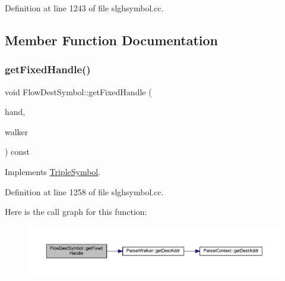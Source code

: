Definition at line 1243 of file slghsymbol.\+cc.



\subsection{Member Function Documentation}
\mbox{\label{class_flow_dest_symbol_aac3ddb7a9bff23acbd59f3b44f477d10}} 
\subsubsection{\texorpdfstring{getFixedHandle()}{getFixedHandle()}}
{\footnotesize\ttfamily void Flow\+Dest\+Symbol\+::get\+Fixed\+Handle (\begin{DoxyParamCaption}\item[{\mbox{\hyperlink{struct_fixed_handle}{Fixed\+Handle}} \&}]{hand,  }\item[{\mbox{\hyperlink{class_parser_walker}{Parser\+Walker}} \&}]{walker }\end{DoxyParamCaption}) const\hspace{0.3cm}{\ttfamily [virtual]}}



Implements \mbox{\hyperlink{class_triple_symbol_aa71f48c79a2bee73e97fdfb8163b4e46}{Triple\+Symbol}}.



Definition at line 1258 of file slghsymbol.\+cc.

Here is the call graph for this function\+:
\nopagebreak
\begin{figure}[H]
\begin{center}
\leavevmode
\includegraphics[width=350pt]{class_flow_dest_symbol_aac3ddb7a9bff23acbd59f3b44f477d10_cgraph}
\end{center}
\end{figure}
\mbox{\label{class_flow_dest_symbol_ad213382efabd756f4246ac8dd15f5a90}} 
